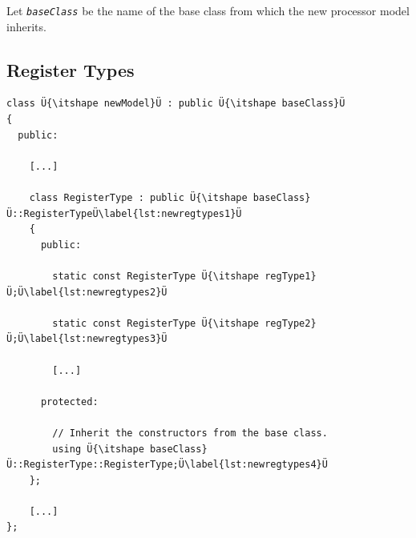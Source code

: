 \begin{wirNote}
Let \texttt{\itshape baseClass} be the name of the base class from which the new processor model inherits.
\end{wirNote}


\subsection{Register Types}
\label{ssec:newregtypes}

\begin{lstlisting}[style=code,float=t,caption={Declaration of a New Processor Model's Register Types},label=lst:newregtypes]
class Ü{\itshape newModel}Ü : public Ü{\itshape baseClass}Ü
{
  public:

    [...]

    class RegisterType : public Ü{\itshape baseClass}Ü::RegisterTypeÜ\label{lst:newregtypes1}Ü
    {
      public:

        static const RegisterType Ü{\itshape regType1}Ü;Ü\label{lst:newregtypes2}Ü

        static const RegisterType Ü{\itshape regType2}Ü;Ü\label{lst:newregtypes3}Ü

        [...]

      protected:

        // Inherit the constructors from the base class.
        using Ü{\itshape baseClass}Ü::RegisterType::RegisterType;Ü\label{lst:newregtypes4}Ü
    };

    [...]
};
\end{lstlisting}

